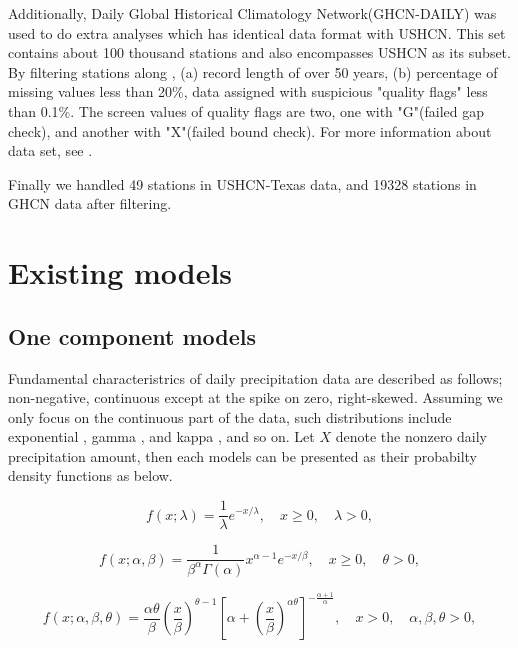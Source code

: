 \documentclass[12pt]{article}\usepackage[]{graphicx}\usepackage[]{color}
\begin{document}
Additionally, Daily Global Historical Climatology Network(GHCN-DAILY) was used to do extra analyses \cite{papalexiou2012entropy, papalexiou2013extreme} which has identical data format with USHCN. This set contains about 100 thousand stations and also encompasses USHCN as its subset. By filtering stations along \cite{papalexiou2013extreme}, (a) record length of over 50 years, (b) percentage of missing values less than 20\%, data assigned with suspicious "quality flags" less than 0.1\%. The screen values of quality flags are two, one with "G"(failed gap check), and another with "X"(failed bound check). For more information about data set, see \cite{menne2012overview}. 


Finally we handled 49 stations in USHCN-Texas data, and 19328 stations in GHCN data after filtering. 



\section{Existing models}

	\subsection{One component models}


Fundamental characteristrics of daily precipitation data are described as follows; non-negative, continuous except at the spike on zero, right-skewed. Assuming we only focus on the continuous part of the data, such distributions include exponential \cite{todorovic1975stochastic}, gamma \cite{ison1971wet, wilks1999interannual, schoof2010development}, and kappa \cite{mielke1973three}, and so on. Let $X$ denote the nonzero daily precipitation amount, then each models can be presented as their probabilty density functions as below. 


\begin{equation}
  \label{exponential.pdf} 
  f(x ; \lambda) = \frac{1} {\lambda} e^{-x / \lambda}, \quad x \geq 0, \quad \lambda > 0,
\end{equation}


\begin{equation}
  \label{gamma.pdf} 
  f(x ; \alpha, \beta) = \frac {1} {\beta^\alpha \Gamma(\alpha)} x^{\alpha - 1} e^{-x/\beta} , \quad x \geq 0, \quad \theta > 0,
\end{equation}


\begin{equation}
  \label{kappa.pdf} 
  f(x ; \alpha, \beta, \theta) = \frac {\alpha \theta} {\beta} (\frac {x} {\beta})^{\theta - 1} [\alpha + (\frac {x} {\beta})^{\alpha \theta}]^{-\frac {\alpha + 1} {\alpha}}, \quad x > 0, \quad \alpha, \beta, \theta > 0,
\end{equation}
\end{document}
